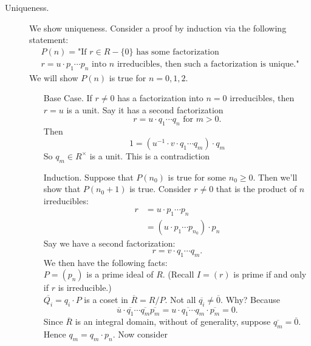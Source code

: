 \begin{prf}
\begin{description}
        \item[Uniqueness.] We show uniqueness. Consider a proof by
        induction via the following statement:
        \begin{align*}
            P(n) = \text{"If } r \in R - \{0\} \text{ has some factorization }\\ 
            r=u\cdot p_1\cdots p_n \text{ into }  n
            \text{ irreducibles, then such a factorization is unique."}
        \end{align*}
        We will show $P(n)$ is true for $n=0,1,2$. 
        \begin{itemize}
            \item[Base Case.] If $r \ne 0$ has a factorization into
            $n = 0$ irreducibles, then $r = u$ is a unit. Say it
            has a second factorization 
            \[
                r = u \cdot q_1 \cdots q_n \text{  for } m>0.
            \]
            Then 
            \[
                1 = (u^{-1}\cdot v \cdot q_1 \cdots q_m)\cdot q_m
            \]
            So $q_m \in R^{\times}$ is a unit. This is a contradiction
            \item[Induction.] 
            Suppose that $P(n_0)$ is true for some $n_0 \ge 0$.
            Then we'll show that $P(n_0 + 1)$ is true. Consider $r
            \ne 0$ that is the product of $n$ irreducibles: 
            \begin{align*}
                r & = u \cdot p_1 \cdots p_n\\
                & = (u \cdot p_1 \cdots p_{n_0}) \cdot p_n
            \end{align*}
            Say we have a second factorization:
            \[
                r = v \cdot q_1 \cdots q_m.
            \]
            We then have the following facts:\\
            $P = (p_n)$ is a prime ideal of $R$. (Recall $I = (r)$
            is prime if and only if $r$ is irreducible.)\\
            $\overline{Q_i} = q_i \cdot P$ is a coset in
            $\overline{R} = R/P$.  Not all $\overline{q_i} \ne
            \overline{0}$. Why? Because 
            \[
                \overline{u} \cdot \overline{q_1} \cdots \overline{q_m}\overline{p_m} = \overline{u\cdot  q_1 \cdots q_m} \cdot \overline{p_m} = 0.
            \]
            Since $\overline{R}$ is an integral domain, without
            of generality,  suppose $\overline{q_m} =
            \overline{0}$. Hence $q_m = q_m \cdot p_n$. Now
            consider 
            \[
\]
\end{itemize}
\end{description}
\end{prf}
